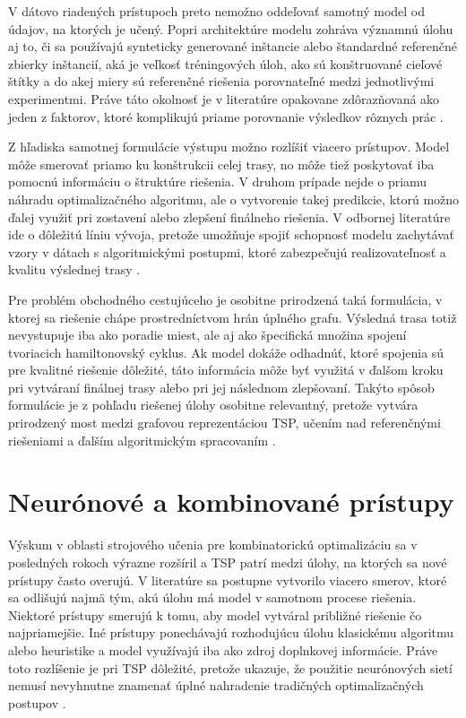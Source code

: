 V dátovo riadených prístupoch preto nemožno oddeľovať samotný model od údajov,
na ktorých je učený. Popri architektúre modelu zohráva významnú úlohu aj to,
či sa používajú synteticky generované inštancie alebo štandardné referenčné
zbierky inštancií,
aká je veľkosť tréningových úloh, ako sú konštruované cieľové štítky a do akej
miery sú referenčné riešenia porovnateľné medzi jednotlivými experimentmi.
Práve táto okolnosť je v literatúre opakovane zdôrazňovaná ako jeden
z faktorov, ktoré komplikujú priame porovnanie výsledkov rôznych prác
\parencite{bengio2021mlco,joshi2022generalization}.

Z hľadiska samotnej formulácie výstupu možno rozlíšiť viacero prístupov.
Model môže smerovať priamo ku konštrukcii celej trasy, no môže tiež poskytovať
iba pomocnú informáciu o štruktúre riešenia. V druhom prípade nejde o priamu
náhradu optimalizačného algoritmu, ale o vytvorenie takej predikcie, ktorú
možno ďalej využiť pri zostavení alebo zlepšení finálneho riešenia.
V odbornej literatúre ide o dôležitú líniu vývoja, pretože umožňuje spojiť
schopnosť modelu zachytávať vzory v dátach s algoritmickými postupmi, ktoré
zabezpečujú realizovateľnosť a kvalitu výslednej trasy
\parencite{joshi2019gcn,hudson2022gls,xin2021neurolkh,joshi2022generalization}.

Pre problém obchodného cestujúceho je osobitne prirodzená taká formulácia,
v ktorej sa riešenie chápe prostredníctvom hrán úplného grafu. Výsledná trasa
totiž nevystupuje iba ako poradie miest, ale aj ako špecifická množina spojení
tvoriacich hamiltonovský cyklus. Ak model dokáže odhadnúť, ktoré spojenia sú
pre kvalitné riešenie dôležité, táto informácia môže byť využitá v ďalšom
kroku pri vytváraní finálnej trasy alebo pri jej následnom zlepšovaní.
Takýto spôsob formulácie je z pohľadu riešenej úlohy osobitne relevantný,
pretože vytvára prirodzený most medzi grafovou reprezentáciou TSP, učením
nad referenčnými riešeniami a ďalším algoritmickým spracovaním
\parencite{joshi2019gcn,hudson2022gls,xin2021neurolkh}.

\section{Neurónové a kombinované prístupy}

Výskum v oblasti strojového učenia pre kombinatorickú optimalizáciu sa
v posledných rokoch výrazne rozšíril a TSP patrí medzi úlohy, na ktorých sa
nové prístupy často overujú. V literatúre sa postupne vytvorilo viacero smerov,
ktoré sa odlišujú najmä tým, akú úlohu má model v samotnom procese riešenia.
Niektoré prístupy smerujú k tomu, aby model vytváral približné riešenie čo
najpriamejšie. Iné prístupy ponechávajú rozhodujúcu úlohu klasickému algoritmu
alebo heuristike a model využívajú iba ako zdroj doplnkovej informácie.
Práve toto rozlíšenie je pri TSP dôležité, pretože ukazuje, že použitie
neurónových sietí nemusí nevyhnutne znamenať úplné nahradenie tradičných
optimalizačných postupov
\parencite{bengio2021mlco,cappart2023gnnco}.

